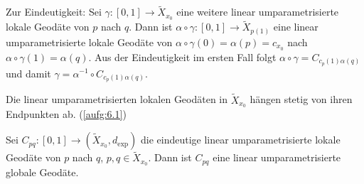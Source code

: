 \begin{beweis}
\begin{description}
		Zur Eindeutigkeit:
		Sei $\gamma \colon [0,1] \rightarrow \tilde{X}_{x_0}$ eine weitere linear umparametrisierte lokale Geodäte von $p$ nach $q$.
		Dann ist $\alpha \circ \gamma \colon [0,1] \rightarrow \tilde{X}_{p(1)}$ eine linear umparametrisierte lokale Geodäte von $\alpha \circ \gamma(0) = \alpha(p) = c_{x_0}$ nach $\alpha \circ \gamma(1) = \alpha(q)$.
		Aus der Eindeutigkeit im ersten Fall folgt $\alpha \circ \gamma = C_{c_p(1)\alpha(q)}$ und damit $\gamma = \alpha^{-1} \circ C_{c_p(1)\alpha(q)}$. \qedhere
	\end{description}
\end{beweis}

\begin{lemma}
\label{lemma:2.39}
	Die linear umparametrisierten lokalen Geodäten in $\tilde{X}_{x_0}$ hängen stetig von ihren Endpunkten ab. (\autoref{aufg:6.1})
\end{lemma}

\begin{lemma}
\label{lemma:2.40}
	Sei $C_{pq}\colon [0,1] \rightarrow (\tilde{X}_{x_0},d_{\exp})$ die eindeutige linear umparametrisierte lokale Geodäte von $p$ nach $q$, $p,q \in \tilde{X}_{x_0}$.
	Dann ist $C_{pq}$ eine linear umparametrisierte globale Geodäte.
\end{lemma}

